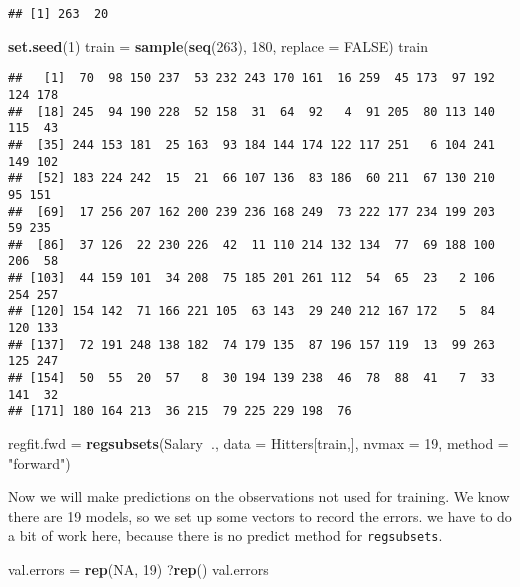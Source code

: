 \documentclass[]{article}
\newenvironment{Shaded}{\begin{snugshade}}{\end{snugshade}}
\newcommand{\KeywordTok}[1]{\textcolor[rgb]{0.13,0.29,0.53}{\textbf{#1}}}
\newcommand{\DataTypeTok}[1]{\textcolor[rgb]{0.13,0.29,0.53}{#1}}
\newcommand{\DecValTok}[1]{\textcolor[rgb]{0.00,0.00,0.81}{#1}}
\newcommand{\StringTok}[1]{\textcolor[rgb]{0.31,0.60,0.02}{#1}}
\newcommand{\OtherTok}[1]{\textcolor[rgb]{0.56,0.35,0.01}{#1}}
\newcommand{\OperatorTok}[1]{\textcolor[rgb]{0.81,0.36,0.00}{\textbf{#1}}}
\newcommand{\NormalTok}[1]{#1}
\begin{document}
\begin{verbatim}
## [1] 263  20
\end{verbatim}

\begin{Shaded}
\begin{Highlighting}[]
\KeywordTok{set.seed}\NormalTok{(}\DecValTok{1}\NormalTok{)}
\NormalTok{train =}\StringTok{ }\KeywordTok{sample}\NormalTok{(}\KeywordTok{seq}\NormalTok{(}\DecValTok{263}\NormalTok{), }\DecValTok{180}\NormalTok{, }\DataTypeTok{replace =} \OtherTok{FALSE}\NormalTok{)}
\NormalTok{train}
\end{Highlighting}
\end{Shaded}

\begin{verbatim}
##   [1]  70  98 150 237  53 232 243 170 161  16 259  45 173  97 192 124 178
##  [18] 245  94 190 228  52 158  31  64  92   4  91 205  80 113 140 115  43
##  [35] 244 153 181  25 163  93 184 144 174 122 117 251   6 104 241 149 102
##  [52] 183 224 242  15  21  66 107 136  83 186  60 211  67 130 210  95 151
##  [69]  17 256 207 162 200 239 236 168 249  73 222 177 234 199 203  59 235
##  [86]  37 126  22 230 226  42  11 110 214 132 134  77  69 188 100 206  58
## [103]  44 159 101  34 208  75 185 201 261 112  54  65  23   2 106 254 257
## [120] 154 142  71 166 221 105  63 143  29 240 212 167 172   5  84 120 133
## [137]  72 191 248 138 182  74 179 135  87 196 157 119  13  99 263 125 247
## [154]  50  55  20  57   8  30 194 139 238  46  78  88  41   7  33 141  32
## [171] 180 164 213  36 215  79 225 229 198  76
\end{verbatim}

\begin{Shaded}
\begin{Highlighting}[]
\NormalTok{regfit.fwd =}\StringTok{ }\KeywordTok{regsubsets}\NormalTok{(Salary}\OperatorTok{~}\NormalTok{., }\DataTypeTok{data =}\NormalTok{ Hitters[train,], }\DataTypeTok{nvmax =} \DecValTok{19}\NormalTok{, }\DataTypeTok{method =} \StringTok{"forward"}\NormalTok{)}
\end{Highlighting}
\end{Shaded}

Now we will make predictions on the observations not used for training.
We know there are 19 models, so we set up some vectors to record the
errors. we have to do a bit of work here, because there is no predict
method for \texttt{regsubsets}.

\begin{Shaded}
\begin{Highlighting}[]
\NormalTok{val.errors =}\StringTok{ }\KeywordTok{rep}\NormalTok{(}\OtherTok{NA}\NormalTok{, }\DecValTok{19}\NormalTok{)}
\NormalTok{?}\KeywordTok{rep}\NormalTok{()}
\NormalTok{val.errors}
\end{Highlighting}
\end{Shaded}
\end{document}
